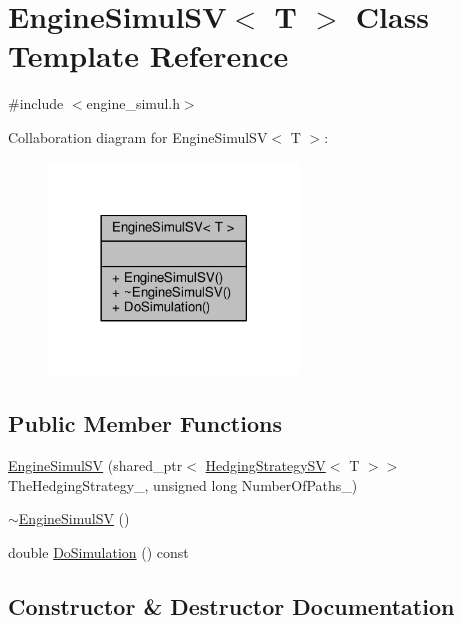 \hypertarget{classEngineSimulSV}{}\section{Engine\+Simul\+SV$<$ T $>$ Class Template Reference}
\label{classEngineSimulSV}


{\ttfamily \#include $<$engine\+\_\+simul.\+h$>$}



Collaboration diagram for Engine\+Simul\+SV$<$ T $>$\+:
\nopagebreak
\begin{figure}[H]
\begin{center}
\leavevmode
\includegraphics[width=189pt]{classEngineSimulSV__coll__graph}
\end{center}
\end{figure}
\subsection*{Public Member Functions}
\begin{DoxyCompactItemize}
\item 
\hyperlink{classEngineSimulSV_a07498f7d0c424f4e7f79be663933a5f4}{Engine\+Simul\+SV} (shared\+\_\+ptr$<$ \hyperlink{classHedgingStrategySV}{Hedging\+Strategy\+SV}$<$ T $>$$>$ The\+Hedging\+Strategy\+\_\+, unsigned long Number\+Of\+Paths\+\_\+)
\item 
\hyperlink{classEngineSimulSV_a3d2d099c94f7ff0a717cc85769413f72}{$\sim$\+Engine\+Simul\+SV} ()
\item 
double \hyperlink{classEngineSimulSV_a1883c6f71ba18603fc28b03415c8c0dd}{Do\+Simulation} () const
\end{DoxyCompactItemize}


\subsection{Constructor \& Destructor Documentation}
\hypertarget{classEngineSimulSV_a07498f7d0c424f4e7f79be663933a5f4}{}\label{classEngineSimulSV_a07498f7d0c424f4e7f79be663933a5f4} 
